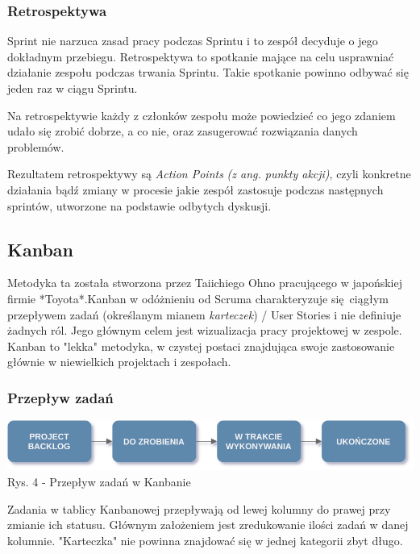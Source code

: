 \documentclass{article}
\begin{document}
\subsubsection*{Retrospektywa}
Sprint nie narzuca zasad pracy podczas Sprintu i to zespół decyduje o jego dokładnym przebiegu. Retrospektywa to spotkanie mające na celu usprawniać działanie zespołu podczas trwania Sprintu. Takie spotkanie powinno odbywać się jeden raz w ciągu Sprintu.

Na retrospektywie każdy z członków zespołu może powiedzieć co jego zdaniem udało się zrobić dobrze, a co nie, oraz zasugerować rozwiązania danych problemów.

Rezultatem retrospektywy są \textit{Action Points} \textit{(z ang. punkty akcji)}, czyli konkretne działania bądź zmiany w procesie jakie zespół zastosuje podczas następnych sprintów, utworzone na podstawie odbytych dyskusji.

\subsection{Kanban}
Metodyka ta została stworzona przez Taiichiego Ohno pracującego w japońskiej firmie *Toyota*\cite{kanban}.Kanban w odóżnieniu od Scruma charakteryzuje się ciągłym przepływem zadań (określanym mianem \textit{karteczek}) / User Stories i nie definiuje żadnych ról. Jego głównym celem jest wizualizacja pracy projektowej w zespole. Kanban to "lekka" metodyka, w czystej postaci znajdująca swoje zastosowanie głównie w niewielkich projektach i zespołach\cite{kanban2}.

\subsubsection{Przepływ zadań}

\begin{center}
    \includegraphics[scale=0.35]{kanban.png}
    \newline
    Rys. 4 - Przepływ zadań w Kanbanie
\end{center}

Zadania w tablicy Kanbanowej przepływają od lewej kolumny do prawej przy zmianie ich statusu. Głównym założeniem jest zredukowanie ilości zadań w danej kolumnie. "Karteczka" nie powinna znajdować się w jednej kategorii zbyt długo.
\end{document}
